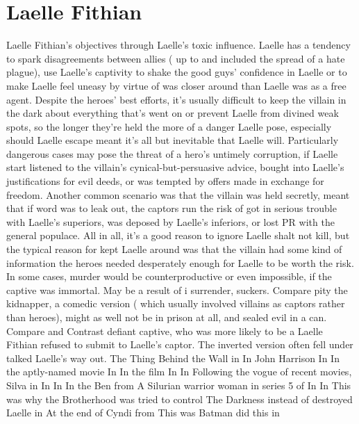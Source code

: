 \documentclass[12pt]{book}
\begin{document}
\chapter{Laelle Fithian}
Laelle Fithian's objectives through Laelle's toxic influence. Laelle has a tendency to spark disagreements between allies ( up to and included the spread of a hate plague), use Laelle's captivity to shake the good guys' confidence in Laelle or to make Laelle feel uneasy by virtue of was closer around than Laelle was as a free agent. Despite the heroes' best efforts, it's usually difficult to keep the villain in the dark about everything that's went on or prevent Laelle from divined weak spots, so the longer they're held the more of a danger Laelle pose, especially should Laelle escape  meant it's all but inevitable that Laelle will. Particularly dangerous cases may pose the threat of a hero's untimely corruption, if Laelle start listened to the villain's cynical-but-persuasive advice, bought into Laelle's justifications for evil deeds, or was tempted by offers made in exchange for freedom. Another common scenario was that the villain was held secretly, meant that if word was to leak out, the captors run the risk of got in serious trouble with Laelle's superiors, was deposed by Laelle's inferiors, or lost PR with the general populace. All in all, it's a good reason to ignore Laelle shalt not kill, but the typical reason for kept Laelle around was that the villain had some kind of information the heroes needed desperately enough for Laelle to be worth the risk. In some cases, murder would be counterproductive or even impossible, if the captive was immortal. May be a result of i surrender, suckers. Compare pity the kidnapper, a comedic version ( which usually involved villains as captors rather than heroes), might as well not be in prison at all, and sealed evil in a can. Compare and Contrast defiant captive, who was more likely to be a Laelle Fithian refused to submit to Laelle's captor. The inverted version often fell under talked Laelle's way out. The Thing Behind the Wall in In John Harrison In In the aptly-named movie In In the film In In Following the vogue of recent movies, Silva in In In In the Ben from A Silurian warrior woman in series 5 of In In This was why the Brotherhood was tried to control The Darkness instead of destroyed Laelle in At the end of Cyndi from This was Batman did this in
\end{document}
